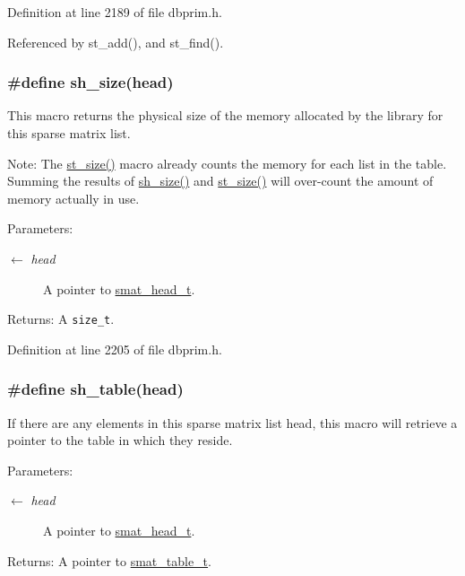 Definition at line 2189 of file dbprim.h.

Referenced by st\_\-add(), and st\_\-find().\hypertarget{group__dbprim__smat_ga53}{
\subsubsection[sh\_\-size]{\setlength{\rightskip}{0pt plus 5cm}\#define sh\_\-size(head)}}
\label{group__dbprim__smat_ga53}


This macro returns the physical size of the memory allocated by the library for this sparse matrix list.

\begin{Desc}
\item[Note:]The \hyperlink{group__dbprim__smat_ga40}{st\_\-size()} macro already counts the memory for each list in the table. Summing the results of \hyperlink{group__dbprim__smat_ga53}{sh\_\-size()} and \hyperlink{group__dbprim__smat_ga40}{st\_\-size()} will over-count the amount of memory actually in use.\end{Desc}
\begin{Desc}
\item[Parameters:]
\begin{description}
\item[\mbox{$\leftarrow$} {\em head}]A pointer to \hyperlink{group__dbprim__smat_ga1}{smat\_\-head\_\-t}.\end{description}
\end{Desc}
\begin{Desc}
\item[Returns:]A {\tt size\_\-t}.\end{Desc}


Definition at line 2205 of file dbprim.h.\hypertarget{group__dbprim__smat_ga45}{
\subsubsection[sh\_\-table]{\setlength{\rightskip}{0pt plus 5cm}\#define sh\_\-table(head)}}
\label{group__dbprim__smat_ga45}


If there are any elements in this sparse matrix list head, this macro will retrieve a pointer to the table in which they reside.

\begin{Desc}
\item[Parameters:]
\begin{description}
\item[\mbox{$\leftarrow$} {\em head}]A pointer to \hyperlink{group__dbprim__smat_ga1}{smat\_\-head\_\-t}.\end{description}
\end{Desc}
\begin{Desc}
\item[Returns:]A pointer to \hyperlink{group__dbprim__smat_ga0}{smat\_\-table\_\-t}.\end{Desc}


